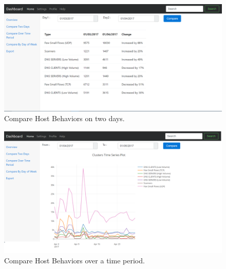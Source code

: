  
\begin{figure}[t]
	\centerline{\includegraphics[scale = 0.45]{tool_compare_days.png}}
	\caption{Compare Host Behaviors on two days.}%
\end{figure} 


\begin{figure}[t]
	\centerline{\includegraphics[scale = 0.45]{tool_compare_week.png}}
	\caption{Compare Host Behaviors over a time period.}%
\end{figure}
